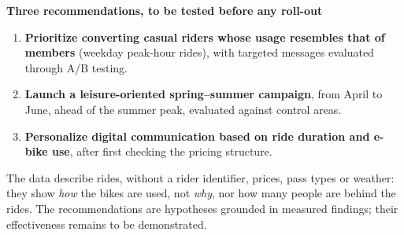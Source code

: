 \textbf{Three recommendations, to be tested before any roll-out} \Hyp
\begin{enumerate}
  \item \textbf{Prioritize converting casual riders whose usage resembles that of members} (weekday peak-hour rides), with targeted messages evaluated through A/B testing.
  \item \textbf{Launch a leisure-oriented spring--summer campaign}, from April to June, ahead of the summer peak, evaluated against control areas.
  \item \textbf{Personalize digital communication based on ride duration and e-bike use}, after first checking the pricing structure.
\end{enumerate}

\begin{keybox}
The data describe rides, without a rider identifier, prices, pass types or weather: they show \emph{how} the bikes are used, not \emph{why}, nor how many people are behind the rides. The recommendations are hypotheses grounded in measured findings; their effectiveness remains to be demonstrated.
\end{keybox}
